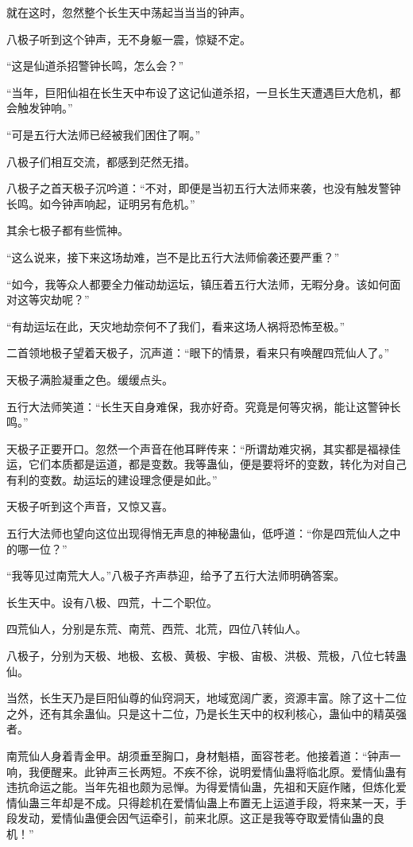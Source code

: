 \begin{this_body}
就在这时，忽然整个长生天中荡起当当当的钟声。

八极子听到这个钟声，无不身躯一震，惊疑不定。

“这是仙道杀招警钟长鸣，怎么会？”

“当年，巨阳仙祖在长生天中布设了这记仙道杀招，一旦长生天遭遇巨大危机，都会触发钟响。”

“可是五行大法师已经被我们困住了啊。”

八极子们相互交流，都感到茫然无措。

八极子之首天极子沉吟道：“不对，即便是当初五行大法师来袭，也没有触发警钟长鸣。如今钟声响起，证明另有危机。”

其余七极子都有些慌神。

“这么说来，接下来这场劫难，岂不是比五行大法师偷袭还要严重？”

“如今，我等众人都要全力催动劫运坛，镇压着五行大法师，无暇分身。该如何面对这等灾劫呢？”

“有劫运坛在此，天灾地劫奈何不了我们，看来这场人祸将恐怖至极。”

二首领地极子望着天极子，沉声道：“眼下的情景，看来只有唤醒四荒仙人了。”

天极子满脸凝重之色。缓缓点头。

五行大法师笑道：“长生天自身难保，我亦好奇。究竟是何等灾祸，能让这警钟长鸣。”

天极子正要开口。忽然一个声音在他耳畔传来：“所谓劫难灾祸，其实都是福禄佳运，它们本质都是运道，都是变数。我等蛊仙，便是要将坏的变数，转化为对自己有利的变数。劫运坛的建设理念便是如此。”

天极子听到这个声音，又惊又喜。

五行大法师也望向这位出现得悄无声息的神秘蛊仙，低呼道：“你是四荒仙人之中的哪一位？”

“我等见过南荒大人。”八极子齐声恭迎，给予了五行大法师明确答案。

长生天中。设有八极、四荒，十二个职位。

四荒仙人，分别是东荒、南荒、西荒、北荒，四位八转仙人。

八极子，分别为天极、地极、玄极、黄极、宇极、宙极、洪极、荒极，八位七转蛊仙。

当然，长生天乃是巨阳仙尊的仙窍洞天，地域宽阔广袤，资源丰富。除了这十二位之外，还有其余蛊仙。只是这十二位，乃是长生天中的权利核心，蛊仙中的精英强者。

南荒仙人身着青金甲。胡须垂至胸口，身材魁梧，面容苍老。他接着道：“钟声一响，我便醒来。此钟声三长两短。不疾不徐，说明爱情仙蛊将临北原。爱情仙蛊有违抗命运之能。当年先祖也颇为忌惮。为得爱情仙蛊，先祖和天庭作赌，但炼化爱情仙蛊三年却是不成。只得趁机在爱情仙蛊上布置无上运道手段，将来某一天，手段发动，爱情仙蛊便会因气运牵引，前来北原。这正是我等夺取爱情仙蛊的良机！”


\end{this_body}
